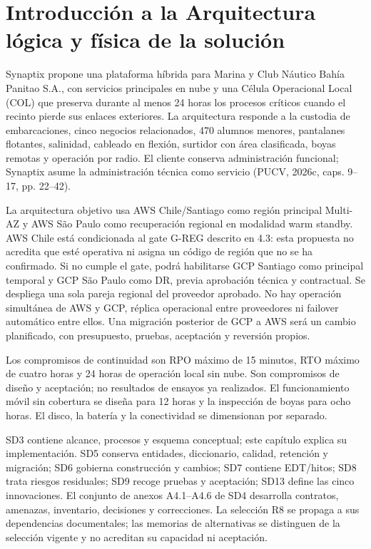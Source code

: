 \documentclass[11pt,letterpaper]{report}
\begin{document}
\tableofcontents
\clearpage
\setcounter{chapter}{3}
\chapter{Introducción a la Arquitectura lógica y física de la solución}
Synaptix propone una plataforma híbrida para Marina y Club Náutico Bahía Panitao S.A., con servicios principales en nube y una Célula Operacional Local (COL) que preserva durante al menos 24 horas los procesos críticos cuando el recinto pierde sus enlaces exteriores. La arquitectura responde a la custodia de embarcaciones, cinco negocios relacionados, 470 alumnos menores, pantalanes flotantes, salinidad, cableado en flexión, surtidor con área clasificada, boyas remotas y operación por radio. El cliente conserva administración funcional; Synaptix asume la administración técnica como servicio (PUCV, 2026c, caps. 9--17, pp. 22--42).

La arquitectura objetivo usa AWS Chile/Santiago como región principal Multi-AZ y AWS São Paulo como recuperación regional en modalidad warm standby. AWS Chile está condicionada al gate G-REG descrito en 4.3: esta propuesta no acredita que esté operativa ni asigna un código de región que no se ha confirmado. Si no cumple el gate, podrá habilitarse GCP Santiago como principal temporal y GCP São Paulo como DR, previa aprobación técnica y contractual. Se despliega una sola pareja regional del proveedor aprobado. No hay operación simultánea de AWS y GCP, réplica operacional entre proveedores ni failover automático entre ellos. Una migración posterior de GCP a AWS será un cambio planificado, con presupuesto, pruebas, aceptación y reversión propios.

Los compromisos de continuidad son RPO máximo de 15 minutos, RTO máximo de cuatro horas y 24 horas de operación local sin nube. Son compromisos de diseño y aceptación; no resultados de ensayos ya realizados. El funcionamiento móvil sin cobertura se diseña para 12 horas y la inspección de boyas para ocho horas. El disco, la batería y la conectividad se dimensionan por separado.

SD3 contiene alcance, procesos y esquema conceptual; este capítulo explica su implementación. SD5 conserva entidades, diccionario, calidad, retención y migración; SD6 gobierna construcción y cambios; SD7 contiene EDT/hitos; SD8 trata riesgos residuales; SD9 recoge pruebas y aceptación; SD13 define las cinco innovaciones. El conjunto de anexos A4.1--A4.6 de SD4 desarrolla contratos, amenazas, inventario, decisiones y correcciones. La selección R8 se propaga a sus dependencias documentales; las memorias de alternativas se distinguen de la selección vigente y no acreditan su capacidad ni aceptación.
\end{document}
